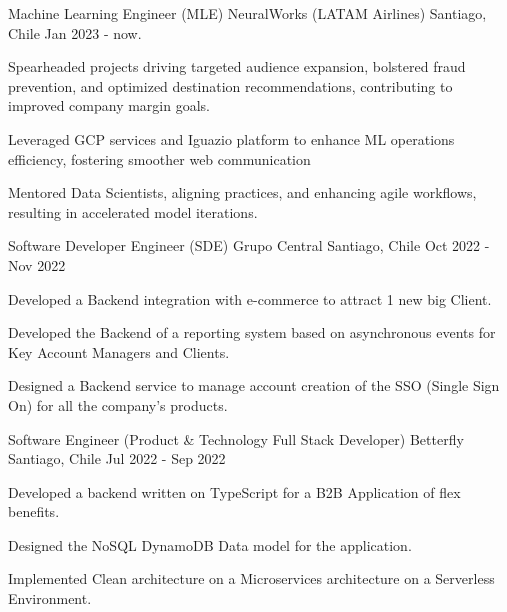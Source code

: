   \cventry
  {Machine Learning Engineer (MLE)}
  {NeuralWorks (LATAM Airlines)}
  {Santiago, Chile}
  {Jan 2023 - now.}
  {
    \begin{cvitems} %
      \item {Spearheaded projects driving targeted audience expansion, bolstered fraud prevention, and optimized destination recommendations, contributing to improved company margin goals.}
      \item {Leveraged GCP services and Iguazio platform to enhance ML operations efficiency, fostering smoother web communication}
      \item {Mentored Data Scientists, aligning practices, and enhancing agile workflows, resulting in accelerated model iterations.}
    \end{cvitems}
  }
  \newline
  \cventry
  {Software Developer Engineer (SDE)}
  {Grupo Central}
  {Santiago, Chile}
  {Oct 2022 - Nov 2022}
  {
    \begin{cvitems} %
      \item {Developed a Backend integration with e-commerce to attract 1 new big Client.}
      \item {Developed the Backend of a reporting system based on asynchronous events for Key Account Managers and Clients.}
      \item {Designed a Backend service to manage account creation of the SSO (Single Sign On) for all the company's products.}
    \end{cvitems}
  }
  \newline
  \cventry
  {Software Engineer (Product \& Technology Full Stack Developer)} %
  {Betterfly} %
  {Santiago, Chile} %
  {Jul 2022 - Sep 2022} %
  {
    \begin{cvitems} %
      \item {Developed a backend written on TypeScript for a B2B Application of flex benefits.}
      \item {Designed the NoSQL DynamoDB Data model for the application.}
      \item {Implemented Clean architecture on a Microservices architecture on a Serverless Environment.}
    \end{cvitems}
  }
